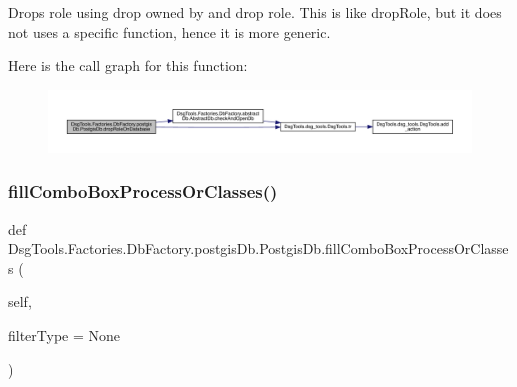 \begin{DoxyVerb}Drops role using drop owned by and drop role.
This is like dropRole, but it does not uses a specific function, hence it is more generic.
\end{DoxyVerb}
 Here is the call graph for this function\+:
\nopagebreak
\begin{figure}[H]
\begin{center}
\leavevmode
\includegraphics[width=350pt]{class_dsg_tools_1_1_factories_1_1_db_factory_1_1postgis_db_1_1_postgis_db_a954277357ca99e90691f346044ed3a91_cgraph}
\end{center}
\end{figure}
\mbox{\label{class_dsg_tools_1_1_factories_1_1_db_factory_1_1postgis_db_1_1_postgis_db_a9fdc672cb1a4843cd39798739f33d2f9}} 
\subsubsection{\texorpdfstring{fill\+Combo\+Box\+Process\+Or\+Classes()}{fillComboBoxProcessOrClasses()}}
{\footnotesize\ttfamily def Dsg\+Tools.\+Factories.\+Db\+Factory.\+postgis\+Db.\+Postgis\+Db.\+fill\+Combo\+Box\+Process\+Or\+Classes (\begin{DoxyParamCaption}\item[{}]{self,  }\item[{}]{filter\+Type = {\ttfamily None} }\end{DoxyParamCaption})}


